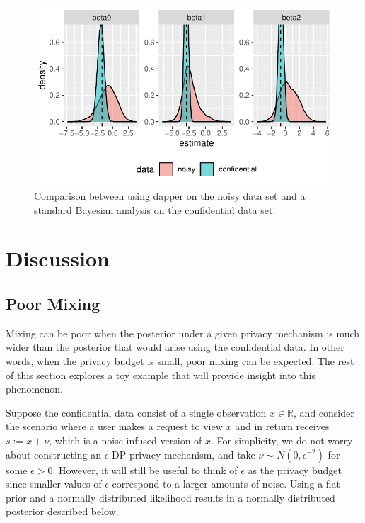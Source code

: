 \begin{figure}

{\centering \includegraphics{dppaper_files/figure-latex/regression-data-compare-1} 

}

\caption{Comparison between using dapper on the noisy data set and a standard
Bayesian analysis on the confidential data set.}\label{fig:regression-data-compare}
\end{figure}

\hypertarget{discussion}{%
\section{Discussion}\label{discussion}}

\hypertarget{poor-mixing}{%
\subsection{Poor Mixing}\label{poor-mixing}}

Mixing can be poor when the posterior under a given privacy mechanism is
much wider than the posterior that would arise using the confidential data. In
other words, when the privacy budget is small, poor mixing can be expected. The
rest of this section explores a toy example that will provide insight into this
phenomenon.

Suppose the confidential data consist of a single observation \(x \in \mathbb{R}\),
and consider the scenario where a user makes a request to view \(x\) and
in return receives \(s := x + \nu\), which is a noise infused version of \(x\).
For simplicity, we do not worry about constructing an \(\epsilon\)-DP privacy mechanism,
and take \(\nu \sim N(0, \epsilon^{-2})\) for some \(\epsilon > 0\). However, it
will still be useful to think of \(\epsilon\) as the privacy budget since smaller values
of \(\epsilon\) correspond to a larger amounts of noise. Using
a flat prior and a normally distributed likelihood results in
a normally distributed posterior described below.

